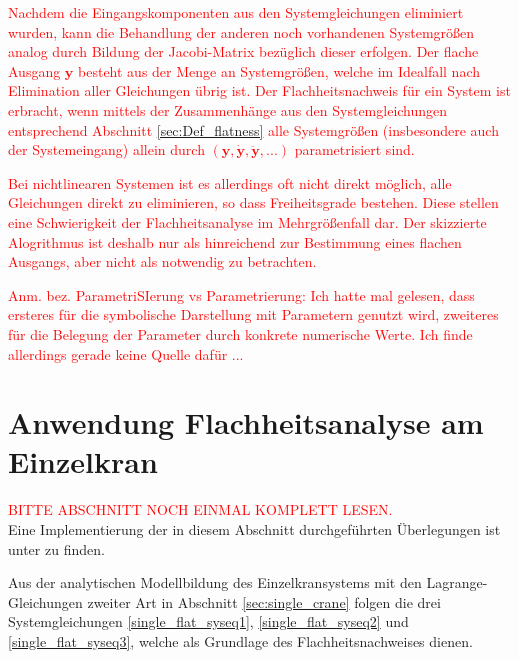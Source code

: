 \textcolor{red}{Nachdem die Eingangskomponenten aus den Systemgleichungen eliminiert wurden, kann die Behandlung der anderen noch vorhandenen Systemgrößen analog durch Bildung der Jacobi-Matrix bezüglich dieser erfolgen. Der  flache Ausgang $\mathbf{y}$ besteht aus der Menge an Systemgrößen, welche im Idealfall nach Elimination aller Gleichungen übrig ist. Der Flachheitsnachweis für ein System ist erbracht, wenn mittels der Zusammenhänge aus den Systemgleichungen entsprechend Abschnitt \ref{sec:Def_flatness} alle Systemgrößen (insbesondere auch der Systemeingang) allein durch $(\mathbf{y}, \dot{\mathbf{y}}, \ddot{\mathbf{y}}, ...)$ parametrisiert sind.}

\textcolor{red}{Bei nichtlinearen Systemen ist es allerdings oft nicht direkt möglich, alle Gleichungen direkt zu eliminieren, so dass Freiheitsgrade bestehen. Diese stellen eine Schwierigkeit der Flachheitsanalyse im Mehrgrößenfall dar. Der skizzierte Alogrithmus ist deshalb nur als hinreichend zur Bestimmung eines flachen Ausgangs, aber nicht als notwendig zu betrachten.}

\textcolor{red}{Anm. bez. ParametriSIerung vs Parametrierung: Ich hatte mal gelesen, dass ersteres für die symbolische Darstellung mit Parametern genutzt wird, zweiteres für die Belegung der Parameter durch konkrete numerische Werte. Ich finde allerdings gerade keine Quelle dafür ...}

\section{Anwendung Flachheitsanalyse am Einzelkran}
\textcolor{red}{BITTE ABSCHNITT NOCH EINMAL KOMPLETT LESEN.}\\
Eine Implementierung der in diesem Abschnitt durchgeführten Überlegungen ist unter \cite[flatness\_notebooks/ODE\_flatness\_analysis\_single\_crane.ipynb]{SAGithub} zu finden.

Aus der analytischen Modellbildung des Einzelkransystems mit den Lagrange-Gleichungen zweiter Art in Abschnitt \ref{sec:single_crane} folgen die drei Systemgleichungen \eqref{single_flat_syseq1}, \eqref{single_flat_syseq2} und \eqref{single_flat_syseq3}, welche als Grundlage des Flachheitsnachweises dienen. 

